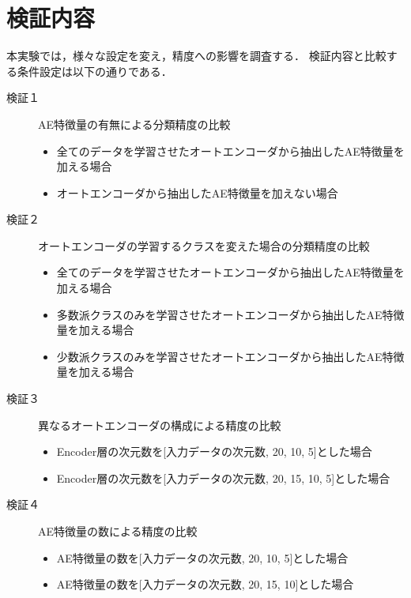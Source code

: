 \section{検証内容}
本実験では，様々な設定を変え，精度への影響を調査する．
検証内容と比較する条件設定は以下の通りである．

\begin{description}
    \item [検証１] AE特徴量の有無による分類精度の比較
    \begin{itemize}
        \item 全てのデータを学習させたオートエンコーダから抽出したAE特徴量を加える場合
        \item オートエンコーダから抽出したAE特徴量を加えない場合
    \end{itemize}

    \item [検証２] オートエンコーダの学習するクラスを変えた場合の分類精度の比較
    \begin{itemize}
        \item 全てのデータを学習させたオートエンコーダから抽出したAE特徴量を加える場合
        \item 多数派クラスのみを学習させたオートエンコーダから抽出したAE特徴量を加える場合
        \item 少数派クラスのみを学習させたオートエンコーダから抽出したAE特徴量を加える場合
    \end{itemize}

    \item [検証３] 異なるオートエンコーダの構成による精度の比較
    \begin{itemize}
        \item Encoder層の次元数を[入力データの次元数, 20, 10, 5]とした場合
        \item Encoder層の次元数を[入力データの次元数, 20, 15, 10, 5]とした場合
    \end{itemize}

    \item [検証４] AE特徴量の数による精度の比較
    \begin{itemize}
        \item AE特徴量の数を[入力データの次元数, 20, 10, 5]とした場合
        \item AE特徴量の数を[入力データの次元数, 20, 15, 10]とした場合
    \end{itemize}


\end{description}
